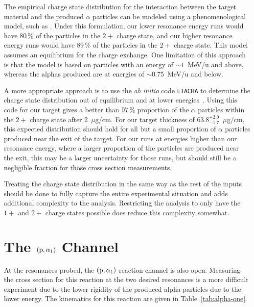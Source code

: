 The empirical charge state distribution for the interaction between the
target material and the produced $\alpha$ particles can be modeled using
a phenomenological model, such as \cite{Sayer1977}. Under this
formulation, our lower resonance energy runs would have 80\,\% of the
particles in the $2+$ charge state, and our higher resonance energy runs
would have 89\,\% of the particles in the $2+$ charge state. This model
assumes an equilibrium for the charge exchange. One limitation of this
approach is that the model is based on particles with an energy of
$\sim 1$~MeV/u and above, whereas the alphas produced are at energies of
$\sim 0.75$~MeV/u and below.

A more appropriate approach is to use the \textit{ab initio} code
\verb+ETACHA+ to determine the charge state distribution out of
equilibrium and at lower energies~\cite{Lamour2015}. Using this code
for our  target gives a better than 97\,\% proportion of
the $\alpha$ particles within the $2+$ charge state after
2~$\mu$g/cm\squared{}. For our target thickness of
$63.8^{+2.0}_{-1.7}$~$\mu$g/cm\squared{}, this expected distribution
should hold for all but a small proportion of $\alpha$ particles
produced near the exit of the target. For our runs at energies higher
than our resonance energy, where a larger proportion of the particles
are produced near the exit, this may be a larger uncertainty for those
runs, but should still be a negligible fraction for those cross section
measurements.

Treating the charge state distribution in the same way as the rest of
the inputs should be done to fully capture the entire experimental
situation and adds additional complexity to the analysis. Restricting
the analysis to only have the $1+$ and $2+$ charge states possible does
reduce this complexity somewhat.


\section{The $({\rm p},\alpha_1)$ Channel}
\label{sec:the-palpha_1-channel}

At the resonances probed, the $({\rm p},\alpha_1)$ reaction channel is
also open. Measuring the cross section for this reaction at the two
desired resonances is a more difficult experiment due to the lower
rigidity of the produced alpha particles due to the lower energy. The
kinematics for this reaction are given in Table~\ref{tab:alpha-one}.

